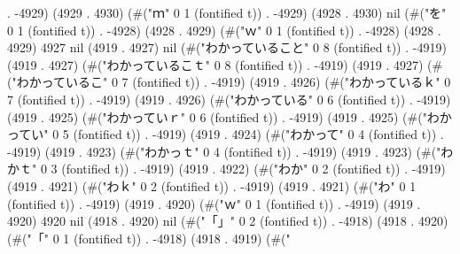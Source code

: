 . -4929) (4929 . 4930) (#("ｍ" 0 1 (fontified t)) . -4929) (4928 . 4930) nil (#("を" 0 1 (fontified t)) . -4928) (4928 . 4929) (#("ｗ" 0 1 (fontified t)) . -4928) (4928 . 4929) 4927 nil (4919 . 4927) nil (#("わかっていること" 0 8 (fontified t)) . -4919) (4919 . 4927) (#("わかっているこｔ" 0 8 (fontified t)) . -4919) (4919 . 4927) (#("わかっているこ" 0 7 (fontified t)) . -4919) (4919 . 4926) (#("わかっているｋ" 0 7 (fontified t)) . -4919) (4919 . 4926) (#("わかっている" 0 6 (fontified t)) . -4919) (4919 . 4925) (#("わかっていｒ" 0 6 (fontified t)) . -4919) (4919 . 4925) (#("わかってい" 0 5 (fontified t)) . -4919) (4919 . 4924) (#("わかって" 0 4 (fontified t)) . -4919) (4919 . 4923) (#("わかっｔ" 0 4 (fontified t)) . -4919) (4919 . 4923) (#("わかｔ" 0 3 (fontified t)) . -4919) (4919 . 4922) (#("わか" 0 2 (fontified t)) . -4919) (4919 . 4921) (#("わｋ" 0 2 (fontified t)) . -4919) (4919 . 4921) (#("わ" 0 1 (fontified t)) . -4919) (4919 . 4920) (#("ｗ" 0 1 (fontified t)) . -4919) (4919 . 4920) 4920 nil (4918 . 4920) nil (#("「」" 0 2 (fontified t)) . -4918) (4918 . 4920) (#("「" 0 1 (fontified t)) . -4918) (4918 . 4919) (#("
